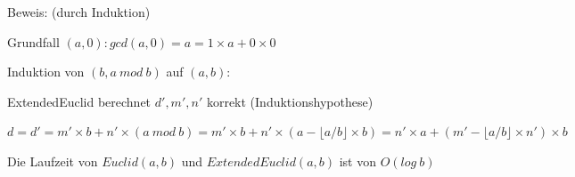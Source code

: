\documentclass[a4paper]{article}
\begin{document}
\begin{multicols}{3}
\begin{itemize*}
\begin{itemize*}
            \end{itemize*}
            \begin{itemize*}
                  \item Beweis: (durch Induktion)
                  \begin{itemize*}
                        \item Grundfall $(a,0): gcd(a, 0) = a = 1 \times a + 0 \times 0$
                        \item Induktion von $(b, a\ mod\ b)$ auf $(a, b)$:
                        \begin{itemize*}
                              \item ExtendedEuclid berechnet $d', m', n'$ korrekt (Induktionshypothese)
                              \item $d=d'=m'\times b+n'\times (a\ mod\ b)=m'\times b+n'\times (a-\lfloor a/b\rfloor\times b)=n'\times a+(m'-\lfloor a/b\rfloor\times n')\times b$
                        \end{itemize*}
                  \end{itemize*}
                  \item Die Laufzeit von $Euclid(a, b)$ und $ExtendedEuclid(a, b)$ ist von $O(log\ b)$

\end{itemize*}
\end{itemize*}
\end{multicols}
\end{document}
